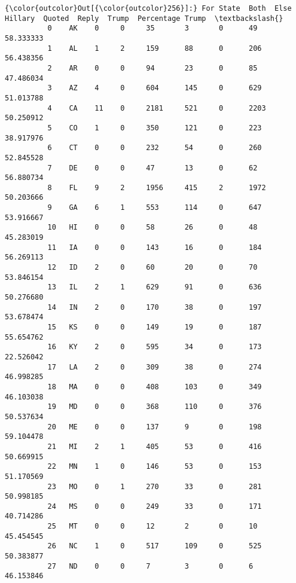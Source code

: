 \documentclass[11pt]{article}
\begin{document}
\begin{Verbatim}[commandchars=\\\{\}]
{\color{outcolor}Out[{\color{outcolor}256}]:} For State  Both  Else  Hillary  Quoted  Reply  Trump  Percentage Trump  \textbackslash{}
          0    AK    0     0     35       3       0      49     58.333333          
          1    AL    1     2     159      88      0      206    56.438356          
          2    AR    0     0     94       23      0      85     47.486034          
          3    AZ    4     0     604      145     0      629    51.013788          
          4    CA    11    0     2181     521     0      2203   50.250912          
          5    CO    1     0     350      121     0      223    38.917976          
          6    CT    0     0     232      54      0      260    52.845528          
          7    DE    0     0     47       13      0      62     56.880734          
          8    FL    9     2     1956     415     2      1972   50.203666          
          9    GA    6     1     553      114     0      647    53.916667          
          10   HI    0     0     58       26      0      48     45.283019          
          11   IA    0     0     143      16      0      184    56.269113          
          12   ID    2     0     60       20      0      70     53.846154          
          13   IL    2     1     629      91      0      636    50.276680          
          14   IN    2     0     170      38      0      197    53.678474          
          15   KS    0     0     149      19      0      187    55.654762          
          16   KY    2     0     595      34      0      173    22.526042          
          17   LA    2     0     309      38      0      274    46.998285          
          18   MA    0     0     408      103     0      349    46.103038          
          19   MD    0     0     368      110     0      376    50.537634          
          20   ME    0     0     137      9       0      198    59.104478          
          21   MI    2     1     405      53      0      416    50.669915          
          22   MN    1     0     146      53      0      153    51.170569          
          23   MO    0     1     270      33      0      281    50.998185          
          24   MS    0     0     249      33      0      171    40.714286          
          25   MT    0     0     12       2       0      10     45.454545          
          26   NC    1     0     517      109     0      525    50.383877          
          27   ND    0     0     7        3       0      6      46.153846          

\end{Verbatim}
\end{document}
